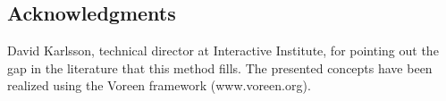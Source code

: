 \documentclass{egpubl}
\begin{document}

\subsection{Acknowledgments}

David Karlsson, technical director at Interactive Institute, for pointing out the gap in the literature that this method fills. The presented concepts have been realized using the Voreen framework (www.voreen.org).

%






\end{document}
